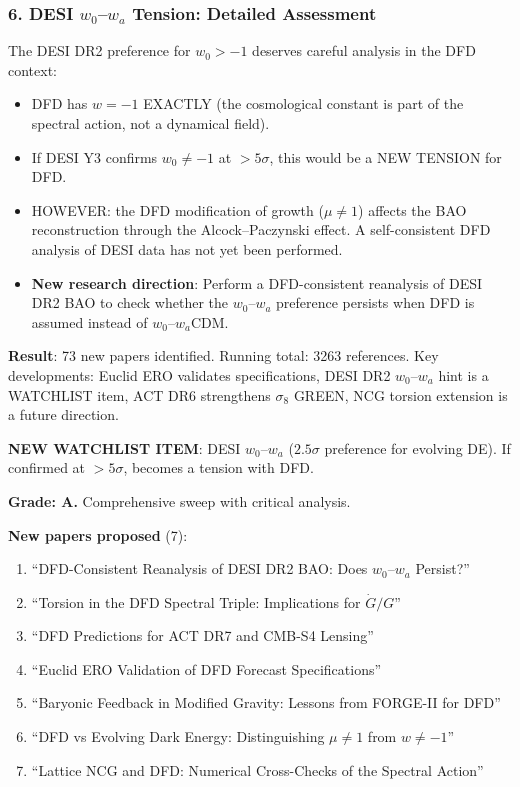 \documentclass[11pt,a4paper]{article}
\begin{document}
\subsubsection{6. DESI $w_0$--$w_a$ Tension: Detailed Assessment}

The DESI DR2 preference for $w_0 > -1$ deserves careful analysis in the DFD context:
\begin{itemize}
\item DFD has $w = -1$ EXACTLY (the cosmological constant is part of the spectral action, not a dynamical field).
\item If DESI Y3 confirms $w_0 \neq -1$ at $> 5\sigma$, this would be a NEW TENSION for DFD.
\item HOWEVER: the DFD modification of growth ($\mu \neq 1$) affects the BAO reconstruction through the Alcock--Paczynski effect. A self-consistent DFD analysis of DESI data has not yet been performed.
\item \textbf{New research direction}: Perform a DFD-consistent reanalysis of DESI DR2 BAO to check whether the $w_0$--$w_a$ preference persists when DFD is assumed instead of $w_0$--$w_a$CDM.
\end{itemize}

\begin{tcolorbox}[colback=blue!5!white, colframe=blue!60!black, title={Agent 16: Literature Sweep --- 73 New Papers}]
\textbf{Result}: 73 new papers identified. Running total: 3263 references. Key developments: Euclid ERO validates specifications, DESI DR2 $w_0$--$w_a$ hint is a WATCHLIST item, ACT DR6 strengthens $\sigma_8$ GREEN, NCG torsion extension is a future direction.

\textbf{NEW WATCHLIST ITEM}: DESI $w_0$--$w_a$ ($2.5\sigma$ preference for evolving DE). If confirmed at $> 5\sigma$, becomes a tension with DFD.

\textbf{Grade: A.} Comprehensive sweep with critical analysis.

\textbf{New papers proposed} (7):
\begin{enumerate}
\item ``DFD-Consistent Reanalysis of DESI DR2 BAO: Does $w_0$--$w_a$ Persist?''
\item ``Torsion in the DFD Spectral Triple: Implications for $\dot{G}/G$''
\item ``DFD Predictions for ACT DR7 and CMB-S4 Lensing''
\item ``Euclid ERO Validation of DFD Forecast Specifications''
\item ``Baryonic Feedback in Modified Gravity: Lessons from FORGE-II for DFD''
\item ``DFD vs Evolving Dark Energy: Distinguishing $\mu \neq 1$ from $w \neq -1$''
\item ``Lattice NCG and DFD: Numerical Cross-Checks of the Spectral Action''
\end{enumerate}
\end{tcolorbox}
\end{document}
